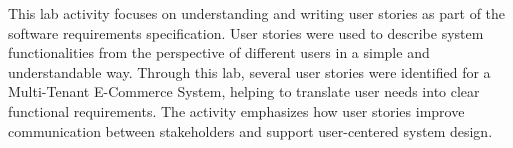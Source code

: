 This lab activity focuses on understanding and writing user stories as part of the software requirements specification. User stories were used to describe system functionalities from the perspective of different users in a simple and understandable way. Through this lab, several user stories were identified for a Multi-Tenant E-Commerce System, helping to translate user needs into clear functional requirements. The activity emphasizes how user stories improve communication between stakeholders and support user-centered system design.
\endinput

